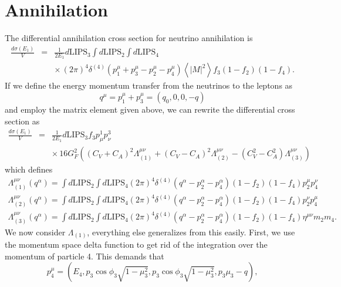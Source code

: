 \documentclass[12pt,letter]{article}
\begin{document}
\section{Annihilation}
The differential annihilation cross section for neutrino annihilation is 
\begin{eqnarray*}
\frac{d \sigma(E_1)}{V} &=& \frac{1}{2 E_1} d\textrm{LIPS}_3 \int d\textrm{LIPS}_2 
\int d\textrm{LIPS}_4 \\
&& \times \, (2 \pi)^4 \delta^{(4)}\left(p^\mu_1 + p^\mu_3 - p^\mu_2 - p^\mu_4 \right)
\left\langle \left| M \right|^2 \right \rangle f_3 (1-f_2)(1-f_4).
\end{eqnarray*}
If we define the energy momentum transfer from the neutrinos to the leptons as
\begin{equation*}
q^\mu = p_1^\mu + p_3^\mu = (q_0,0,0,-q)
\end{equation*}
and employ the matrix element given above, we can rewrite the differential cross section as 
\begin{eqnarray*}
\frac{d \sigma(E_1)}{V} &=& \frac{1}{2 E_1}  d\textrm{LIPS}_3 f_3 
p^1_\mu p^3_\nu \\
&&\times \, 16 G_F^2\left( 
 (C_V+C_A)^2 \Lambda_{(1)}^{\mu \nu}
+(C_V-C_A)^2 \Lambda_{(2)}^{\mu \nu}
-(C_V^2-C_A^2) \Lambda_{(3)}^{\mu \nu} \right)
\end{eqnarray*}
which defines 
\begin{eqnarray*}
\Lambda_{(1)}^{\mu \nu}(q^\alpha) = \int d\textrm{LIPS}_2 \int d\textrm{LIPS}_4
(2 \pi)^4 \delta^{(4)}\left(q^\alpha - p^\alpha_2 - p^\alpha_4 \right) 
(1-f_2)(1-f_4)p^\mu_2 p^\nu_4 \nonumber\\
\Lambda_{(2)}^{\mu \nu}(q^\alpha) = \int d\textrm{LIPS}_2 \int d\textrm{LIPS}_4
(2 \pi)^4 \delta^{(4)}\left(q^\alpha - p^\alpha_2 - p^\alpha_4 \right) 
(1-f_2)(1-f_4) p^\nu_2 p^\mu_4 \nonumber\\
\Lambda_{(3)}^{\mu \nu}(q^\alpha) = \int d\textrm{LIPS}_2 \int d\textrm{LIPS}_4
(2 \pi)^4 \delta^{(4)}\left(q^\alpha - p^\alpha_2 - p^\alpha_4 \right) 
(1-f_2)(1-f_4) \eta^{\mu \nu} m_2 m_4.
\end{eqnarray*}
We now consider $\Lambda_{(1)}$, everything else generalizes from this easily.  
First, we use the momentum space delta function to get rid of the integration over the momentum of particle 4.  This demands that  
\begin{equation*}
p_4^\mu = \left(E_4, p_3 \cos \phi_3 \sqrt{1-\mu_3^2}, 
p_3 \cos \phi_3 \sqrt{1-\mu_3^2}, p_3 \mu_3 - q\right),  
\end{equation*}
\end{document}

